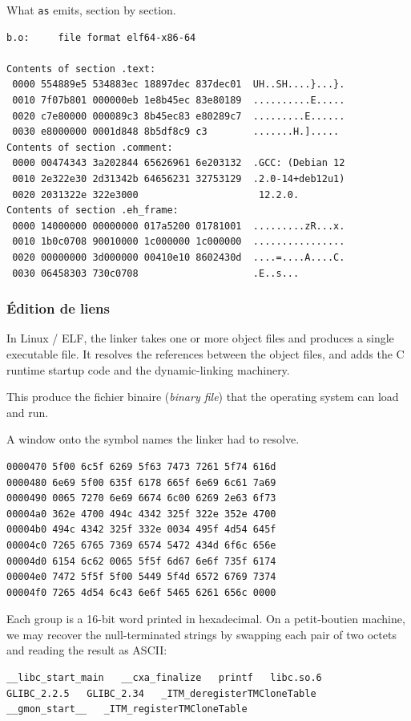 \begin{example}
  What \texttt{as} emits, section by section.
\begin{lstlisting}
b.o:     file format elf64-x86-64

Contents of section .text:
 0000 554889e5 534883ec 18897dec 837dec01  UH..SH....}...}.
 0010 7f07b801 000000eb 1e8b45ec 83e80189  ..........E.....
 0020 c7e80000 000089c3 8b45ec83 e80289c7  .........E......
 0030 e8000000 0001d848 8b5df8c9 c3        .......H.].....
Contents of section .comment:
 0000 00474343 3a202844 65626961 6e203132  .GCC: (Debian 12
 0010 2e322e30 2d31342b 64656231 32753129  .2.0-14+deb12u1)
 0020 2031322e 322e3000                     12.2.0.
Contents of section .eh_frame:
 0000 14000000 00000000 017a5200 01781001  .........zR...x.
 0010 1b0c0708 90010000 1c000000 1c000000  ................
 0020 00000000 3d000000 00410e10 8602430d  ....=....A....C.
 0030 06458303 730c0708                    .E..s...
\end{lstlisting}
\end{example}

\subsubsection{Édition de liens}
\begin{definition}
  In Linux / ELF, the linker takes one or more object files and produces a
  single executable file. It resolves the references between the object files,
  and adds the C runtime startup code and the dynamic-linking machinery.
\end{definition}
This produce the fichier binaire (\textit{binary file}) that the operating
system can load and run.

\begin{example}
  A window onto the symbol names the linker had to resolve.
\begin{lstlisting}
0000470 5f00 6c5f 6269 5f63 7473 7261 5f74 616d
0000480 6e69 5f00 635f 6178 665f 6e69 6c61 7a69
0000490 0065 7270 6e69 6674 6c00 6269 2e63 6f73
00004a0 362e 4700 494c 4342 325f 322e 352e 4700
00004b0 494c 4342 325f 332e 0034 495f 4d54 645f
00004c0 7265 6765 7369 6574 5472 434d 6f6c 656e
00004d0 6154 6c62 0065 5f5f 6d67 6e6f 735f 6174
00004e0 7472 5f5f 5f00 5449 5f4d 6572 6769 7374
00004f0 7265 4d54 6c43 6e6f 5465 6261 656c 0000
\end{lstlisting}
Each group is a 16-bit word printed in hexadecimal. On a petit-boutien machine,
we may recover the null-terminated strings by swapping each pair of two octets
and reading the result as ASCII:
\begin{lstlisting}
__libc_start_main   __cxa_finalize   printf   libc.so.6
GLIBC_2.2.5   GLIBC_2.34   _ITM_deregisterTMCloneTable
__gmon_start__   _ITM_registerTMCloneTable
\end{lstlisting}
\end{example}


